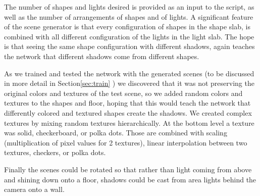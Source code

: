 \documentclass[acmsmall]{acmart}
\begin{document}
The number of shapes and lights desired is provided as an input to the script, as well as the number of arrangements of shapes and of lights. A significant feature of the scene generator is that every configuration of shapes in the shape slab, is combined with all different configuration of the lights in the light slab. The hope is that seeing the same shape configuration with different shadows, again teaches the network that different shadows come from different shapes.

As we trained and tested the network with the generated scenes (to be discussed in more detail in Section\ref{sec:train} ) we discovered that it was not preserving the original colors and textures of the test scene, so we added random colors and textures to the shapes and floor, hoping that this would teach the network that differently colored and textured shapes create the shadows. We created complex textures by mixing random textures hierarchically. At the bottom level a texture was solid, checkerboard, or polka dots. Those are combined with scaling (multiplication of pixel values for 2 textures), linear interpolation between two textures, checkers, or polka dots.

Finally the scenes could be rotated so that rather than light coming from above and shining down onto a floor, shadows could be cast from area lights behind the camera onto a wall. 
\end{document}
